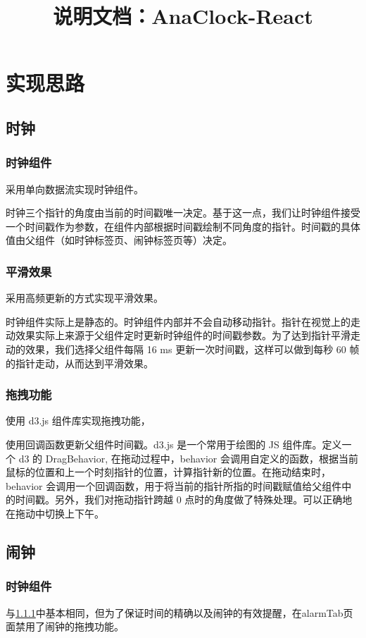 \documentclass[a4paper,11pt]{article}
\title{说明文档：AnaClock-React}
\date{}
\begin{document}
\maketitle

\tableofcontents
\newpage
\section{实现思路}
\subsection{时钟}
\subsubsection{时钟组件}\label{subsec:clock}
采用单向数据流实现时钟组件。

时钟三个指针的角度由当前的时间戳唯一决定。基于这一点，我们让时钟组件接受一个时间戳作为参数，在组件内部根据时间戳绘制不同角度的指针。时间戳的具体值由父组件（如时钟标签页、闹钟标签页等）决定。
\subsubsection{平滑效果}
采用高频更新的方式实现平滑效果。

时钟组件实际上是静态的。时钟组件内部并不会自动移动指针。指针在视觉上的走动效果实际上来源于父组件定时更新时钟组件的时间戳参数。为了达到指针平滑走动的效果，我们选择父组件每隔 16 ms 更新一次时间戳，这样可以做到每秒 60 帧的指针走动，从而达到平滑效果。

\subsubsection{拖拽功能}
使用 d3.js 组件库实现拖拽功能，

使用回调函数更新父组件时间戳。d3.js 是一个常用于绘图的 JS 组件库。定义一个 d3 的 DragBehavior, 在拖动过程中，behavior 会调用自定义的函数，根据当前鼠标的位置和上一个时刻指针的位置，计算指针新的位置。在拖动结束时，behavior 会调用一个回调函数，用于将当前的指针所指的时间戳赋值给父组件中的时间戳。另外，我们对拖动指针跨越 0 点时的角度做了特殊处理。可以正确地在拖动中切换上下午。


\subsection{闹钟}
\subsubsection{时钟组件}
与\ref{subsec:clock}中基本相同，但为了保证时间的精确以及闹钟的有效提醒，在alarmTab页面禁用了闹钟的拖拽功能。
\end{document}
